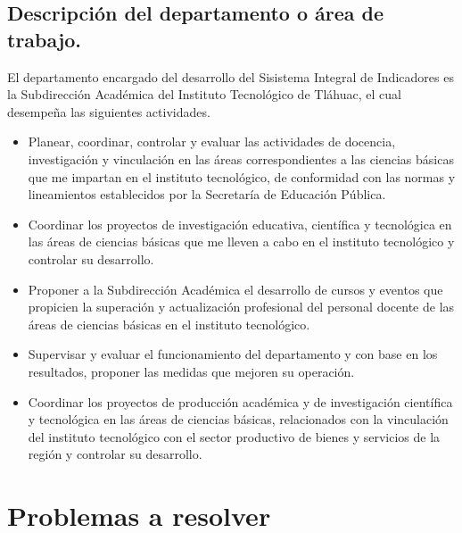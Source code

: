 \subsection{Descripci\'on del departamento o \'area de trabajo.}
El departamento encargado del desarrollo del Sisistema Integral de Indicadores es la Subdirecci\'on Acad\'emica del Instituto Tecnol\'ogico de Tl\'ahuac, el cual desempe\~na las siguientes actividades.

    \begin{itemize}
        \item Planear, coordinar, controlar y evaluar las actividades de docencia, investigaci\'on y vinculaci\'on en las \'areas correspondientes a las ciencias b\'asicas que me impartan en el instituto tecnol\'ogico, de conformidad con las normas y lineamientos establecidos por la Secretar\'ia de Educaci\'on P\'ublica.
 

        \item Coordinar los proyectos de investigaci\'on educativa, cient\'ifica y tecnol\'ogica en las \'areas de ciencias b\'asicas que me lleven a cabo en el instituto tecnol\'ogico y controlar su desarrollo.
 

        \item Proponer a la Subdirecci\'on Acad\'emica el desarrollo de cursos y eventos que propicien la superaci\'on y actualizaci\'on profesional del personal docente de las \'areas de ciencias b\'asicas en el instituto tecnol\'ogico.
 

        \item Supervisar y evaluar el funcionamiento del departamento y con base en los resultados, proponer las medidas que mejoren su operaci\'on.
 

        \item Coordinar los proyectos de producci\'on acad\'emica y de investigaci\'on cient\'ifica y tecnol\'ogica en las \'areas de ciencias b\'asicas, relacionados con la vinculaci\'on del instituto tecnol\'ogico con el sector productivo de bienes y servicios de la regi\'on y controlar su desarrollo.
    \end{itemize}

\section{Problemas a resolver}
\paragraph{}%

